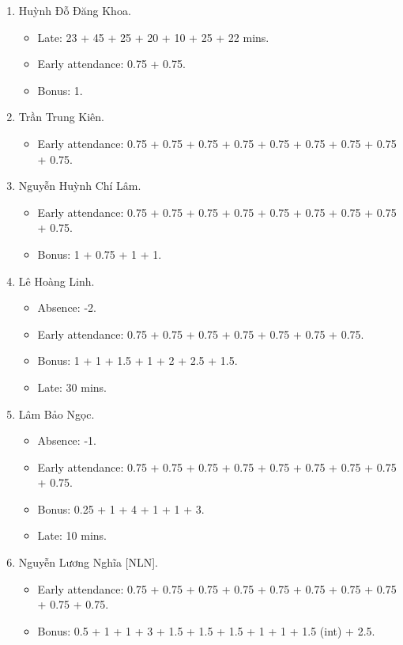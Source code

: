 \documentclass{article}
\begin{document}
\begin{enumerate}
\begin{itemize}
	\end{itemize}
	\item {\sc Huỳnh Đỗ Đăng Khoa.}
	\begin{itemize}
		\item Late: 23 + 45 + 25 + 20 + 10 + 25 + 22 mins.
		\item Early attendance: 0.75 + 0.75.
        \item Bonus: 1.
	\end{itemize}
	\item {\sc Trần Trung Kiên.}
	\begin{itemize}
		\item Early attendance: 0.75 + 0.75 + 0.75 + 0.75 + 0.75 + 0.75 + 0.75 + 0.75 + 0.75.
	\end{itemize}
	\item {\sc Nguyễn Huỳnh Chí Lâm.}
	\begin{itemize}
		\item Early attendance: 0.75 + 0.75 + 0.75 + 0.75 + 0.75 + 0.75 + 0.75 + 0.75 + 0.75.
		\item Bonus: 1 + 0.75 + 1 + 1.
	\end{itemize}
	\item {\sc Lê Hoàng Linh.}
	\begin{itemize}
        \item Absence: -2.
		\item Early attendance: 0.75 + 0.75 + 0.75 + 0.75 + 0.75 + 0.75 + 0.75.
		\item Bonus: 1 + 1 + 1.5 + 1 + 2 + 2.5 + 1.5.
		\item Late: 30 mins.
	\end{itemize}
	\item {\sc Lâm Bảo Ngọc.}
	\begin{itemize}
		\item Absence: -1.
		\item Early attendance: 0.75 + 0.75 + 0.75 + 0.75 + 0.75 + 0.75 + 0.75 + 0.75 + 0.75.
		\item Bonus: 0.25 + 1 + 4 + 1 + 1 + 3.
		\item Late: 10 mins.
	\end{itemize}
	\item {\sc Nguyễn Lương Nghĩa [NLN].}
	\begin{itemize}
		\item Early attendance: 0.75 + 0.75 + 0.75 + 0.75 + 0.75 + 0.75 + 0.75 + 0.75 + 0.75 + 0.75.
		\item Bonus: 0.5 + 1 + 1 + 3 + 1.5 + 1.5 + 1.5 + 1 + 1 + 1.5 (int) + 2.5.
	\end{itemize}

\end{enumerate}
\end{document}
